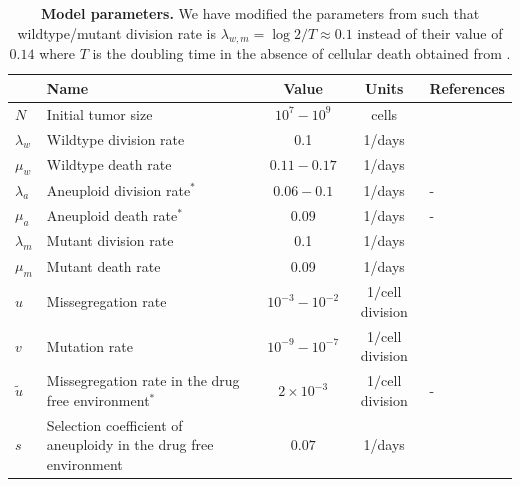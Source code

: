 \documentclass[12pt]{extarticle}
\begin{document}
\newpage
\begin{table}
\begin{center}
  \begin{tabular}{| l |p{5cm}| c | c | p{3cm} |}
    \hline
     & Name & Value & Units & References \\ \hline
    $N$ & Initial tumor size & $10^7-10^9$ & cells  & \citet{del2009does} \\ \hline
    $\lambda_w$ & Wildtype division rate& 0.1 & 1/days  & \citet{bozic2013evolutionary,rew2000cell} \\ \hline
    $\mu_w$ & Wildtype death rate& $0.11-0.17$ & 1/days  & \citet{bozic2013evolutionary} \\ \hline
    $\lambda_a$  & Aneuploid division rate$^\ast$ & $0.06-0.1$ & 1/days  & - \\ \hline
    $\mu_a$ & Aneuploid death rate$^\ast$ & $0.09$ & 1/days  & - \\ \hline
    $\lambda_m$ & Mutant division rate& 0.1 & 1/days  & \citet{bozic2013evolutionary,rew2000cell} \\ \hline
    $\mu_m$ & Mutant death rate& 0.09 & 1/days  & \citet{bozic2013evolutionary,carlson2003tumor} \\ \hline
    $u$ & Missegregation rate& $10^{-3}-10^{-2}$ & 1$\slash$cell division  & \citet{bakker2023predicting} \\ \hline
    $v$ & Mutation rate& $10^{-9}-10^{-7}$ &  1$\slash$cell division  & \citet{bozic2013evolutionary,loeb2001mutator} \\  \hline
    $\tilde{u}$ & Missegregation rate in the drug free environment$^\ast$& $2\times10^{-3}$ & 1$\slash$cell division  & - \\ \hline
    $s$ & Selection coefficient of aneuploidy in the drug free environment& $0.07$ &  1/days   & \citet{lukow2021chromosomal} \\  
    \hline
  \end{tabular}
\caption{\textbf{Model parameters.} 
We have modified the parameters from \citet{bozic2013evolutionary} such that wildtype/mutant division rate is $\lambda_{w,m}=\log2/T\approx0.1$ instead of their value of $0.14$ where $T$ is the doubling time in the absence of cellular death obtained from \citet{rew2000cell}.}
  \label{table1}
\end{center}
\end{table}

\end{document}
